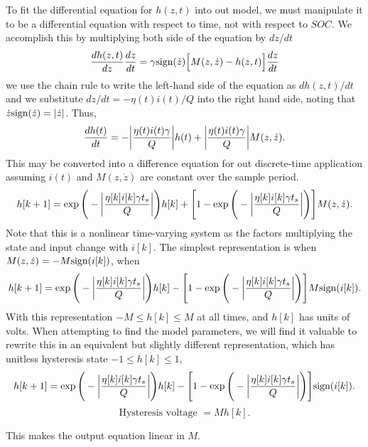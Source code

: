 \documentclass[12pt,a4paper]{scrartcl}
\begin{document}
\begin{onehalfspace}
To fit the differential equation for $h(z,t)$ into out model, we must manipulate it to be a differential equation with respect to time, not with respect to $SOC$. We accomplish this by multiplying both side of the equation by $dz/dt$
\begin{equation}
	\frac{dh(z,t)}{dz}\frac{dz}{dt}=\gamma\text{sign}(\dot{z})\Big[M(z,\dot{z})-h(z,t)\Big]\frac{dz}{dt}
\end{equation} 
we use the chain rule to write the left-hand side of the equation as $dh(z,t)/dt$ and we substitute $dz/dt = -\eta(t)i(t)/Q$ into the right hand side, noting that $\dot{z}\text{sign}(\dot{z})=\abs{\dot{z}}$. Thus,
\begin{equation}
	\frac{dh(t)}{dt} = -\abs{\frac{\eta(t)i(t)\gamma}{Q}}h(t)+\abs{\frac{\eta(t)i(t)\gamma}{Q}}M(z,\dot{z}).
\end{equation}
This may be converted into a difference equation for out discrete-time application assuming $i(t)$ and $M(z,\dot{z})$ are constant over the sample period. 
\begin{equation}
h[k+1] = \exp\Bigg(-\abs{\frac{\eta[k]i[k]\gamma t_s}{Q}}\Bigg)h[k] + \Bigg[1-\exp\Bigg(-\abs{\frac{\eta[k]i[k]\gamma t_s}{Q}}\Bigg)\Bigg]M(z,\dot{z}).
\end{equation}
Note that this is a nonlinear time-varying system as the factors multiplying the state and input change with $i[k]$.
The simplest representation is when $M(z,\dot{z})=-M\text{sign}(i[k])$, when 
 \begin{equation}
 	h[k+1] = \exp\Bigg(-\abs{\frac{\eta[k]i[k]\gamma t_s}{Q}}\Bigg)h[k] - \Bigg[1-\exp\Bigg(-\abs{\frac{\eta[k]i[k]\gamma t_s}{Q}}\Bigg)\Bigg]M\text{sign}(i[k]).
 \end{equation}
With this representation $-M\le h[k] \le M$ at all times, and $h[k]$ has units of volts. When attempting to find the model parameters, we will find it valuable to rewrite this in an equivalent but slightly different representation, which has unitless hysteresis state $-1 \le h[k] \le 1$,
 \begin{equation}
	h[k+1] = \exp\Bigg(-\abs{\frac{\eta[k]i[k]\gamma t_s}{Q}}\Bigg)h[k] - \Bigg[1-\exp\Bigg(-\abs{\frac{\eta[k]i[k]\gamma t_s}{Q}}\Bigg)\Bigg]\text{sign}(i[k]).
\end{equation}
\begin{equation}
\text{Hysteresis voltage } = Mh[k].
\end{equation}


This makes the output equation linear in $M$.


\end{onehalfspace}
\end{document}
